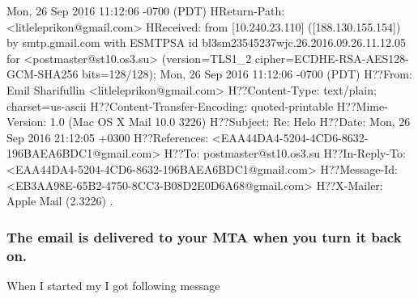 \documentclass[a4paper,11pt]{article}
\begin{document}
\begin{bashcode}
        Mon, 26 Sep 2016 11:12:06 -0700 (PDT)
HReturn-Path: <litleleprikon@gmail.com>
HReceived: from [10.240.23.110] ([188.130.155.154])
        by smtp.gmail.com with ESMTPSA id bl3sm23545237wjc.26.2016.09.26.11.12.05
        for <postmaster@st10.os3.su>
        (version=TLS1_2 cipher=ECDHE-RSA-AES128-GCM-SHA256 bits=128/128);
        Mon, 26 Sep 2016 11:12:06 -0700 (PDT)
H??From: Emil Sharifullin <litleleprikon@gmail.com>
H??Content-Type: text/plain; charset=us-ascii
H??Content-Transfer-Encoding: quoted-printable
H??Mime-Version: 1.0 (Mac OS X Mail 10.0 \(3226\))
H??Subject: Re: Helo
H??Date: Mon, 26 Sep 2016 21:12:05 +0300
H??References: <EAA44DA4-5204-4CD6-8632-196BAEA6BDC1@gmail.com>
H??To: postmaster@st10.os3.su
H??In-Reply-To: <EAA44DA4-5204-4CD6-8632-196BAEA6BDC1@gmail.com>
H??Message-Id: <EB3AA98E-65B2-4750-8CC3-B08D2E0D6A68@gmail.com>
H??X-Mailer: Apple Mail (2.3226)
.

\end{bashcode}

\subsubsection{The email is delivered to your MTA when you turn it back on.}
When I started my I got following message
\end{document}
